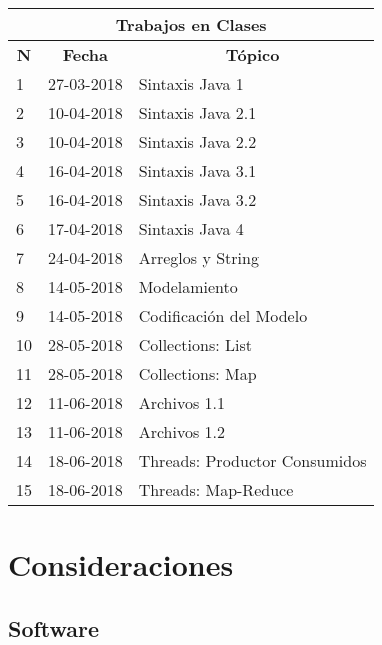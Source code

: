 \documentclass{beamer}
\begin{document}
\begin{frame}
	\begin{table}[!ht]
		 {\scriptsize
			\begin{center}
					 \begin{tabular}{|p{1cm}|p{3cm}|p{5cm}|}\hline
							\multicolumn{3}{|c|}{\textbf{Trabajos en Clases} } \\ \hline
							\multicolumn{1}{|c|}{\textbf{N\°}} &
							\multicolumn{1}{|c|}{\textbf{Fecha}} &
							\multicolumn{1}{c|}{\textbf{T\'opico}}  \\ \hline
							  1 & 27-03-2018 & Sintaxis Java 1 \\ \hline
								2 & 10-04-2018 & Sintaxis Java 2.1 \\ \hline
								3 & 10-04-2018 & Sintaxis Java 2.2 \\ \hline
								4 & 16-04-2018 & Sintaxis Java 3.1\\ \hline
								5 & 16-04-2018 & Sintaxis Java 3.2\\ \hline
								6 & 17-04-2018 & Sintaxis Java 4 \\ \hline
								7 & 24-04-2018 & Arreglos y String \\ \hline
								8 & 14-05-2018 & Modelamiento \\ \hline
								9 & 14-05-2018 & Codificaci\'on del Modelo \\ \hline
							 10 & 28-05-2018 & Collections: List \\ \hline
							 11 & 28-05-2018 & Collections: Map \\ \hline
							 12 & 11-06-2018 & Archivos 1.1 \\ \hline
							 13 & 11-06-2018 & Archivos 1.2 \\ \hline
							 14 & 18-06-2018 & Threads: Productor Consumidos \\ \hline
							 15 & 18-06-2018 & Threads: Map-Reduce \\ \hline
					\end{tabular}
			\end{center}}
	 \end{table}
\end{frame}

	\section{Consideraciones}

		\subsection{Software}
\end{document}
